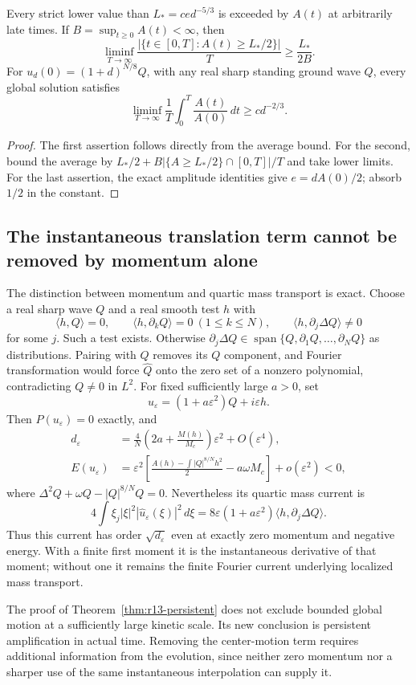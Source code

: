 \begin{corollary}\label{cor:r13-recurring}
Every strict lower value than $L_*=ce d^{-5/3}$ is exceeded by $A(t)$
at arbitrarily late times. If $B=\sup_{t\ge0}A(t)<\infty$, then
\[
 \liminf_{T\to\infty}
 \frac{|\{t\in[0,T]:A(t)\ge L_*/2\}|}{T}
 \ge\frac{L_*}{2B}.
\]
For $u_d(0)=(1+d)^{N/8}Q$, with any real sharp standing ground wave $Q$,
every global solution satisfies
\[
 \liminf_{T\to\infty}\frac1T\int_0^T
        \frac{A(t)}{A(0)}\,dt\ge c d^{-2/3}.
\]
\end{corollary}
\begin{proof}
The first assertion follows directly from the average bound. For the
second, bound the average by
$L_*/2+B|\{A\ge L_*/2\}\cap[0,T]|/T$ and take lower limits.
For the last assertion, the exact amplitude identities give
$e=dA(0)/2$; absorb $1/2$ in the constant.
\end{proof}

\subsection{The instantaneous translation term cannot be removed by momentum alone}
The distinction between momentum and quartic mass transport is exact.
Choose a real sharp wave $Q$ and a real smooth test $h$ with
\[
 \langle h,Q\rangle=0,\qquad
 \langle h,\partial_kQ\rangle=0\ (1\le k\le N),\qquad
 \langle h,\partial_j\Delta Q\rangle\ne0
\]
for some $j$. Such a test exists. Otherwise
$\partial_j\Delta Q\in\operatorname{span}\{Q,\partial_1Q,\ldots,
\partial_NQ\}$ as distributions. Pairing with $Q$ removes its $Q$
component, and Fourier transformation would force $\widehat Q$ onto
the zero set of a nonzero polynomial, contradicting $Q\ne0$ in $L^2$.
For fixed sufficiently large $a>0$, set
\[
 u_\varepsilon=(1+a\varepsilon^2)Q+i\varepsilon h.
\]
Then $P(u_\varepsilon)=0$ exactly, and
\begin{align*}
 d_\varepsilon
 &=\frac4N\left(2a+\frac{M(h)}{M_c}\right)\varepsilon^2
       +O(\varepsilon^4),\\
 E(u_\varepsilon)
 &=\varepsilon^2\left[
 \frac{A(h)-\int|Q|^{8/N}h^2}{2}-a\omega M_c\right]
       +o(\varepsilon^2)<0,
\end{align*}
where $\Delta^2Q+\omega Q-|Q|^{8/N}Q=0$.
Nevertheless its quartic mass current is
\[
 4\int\xi_j|\xi|^2|\widehat u_\varepsilon(\xi)|^2\,d\xi
 =8\varepsilon(1+a\varepsilon^2)
             \langle h,\partial_j\Delta Q\rangle.
\]
Thus this current has order $\sqrt{d_\varepsilon}$ even at exactly zero
momentum and negative energy. With a finite first moment it is the
instantaneous derivative of that moment; without one it remains the
finite Fourier current underlying localized mass transport.

The proof of Theorem~\ref{thm:r13-persistent} does not exclude bounded
global motion at a sufficiently large kinetic scale. Its new conclusion
is persistent amplification in actual time. Removing the center-motion
term requires additional information from the evolution, since neither
zero momentum nor a sharper use of the same instantaneous interpolation
can supply it.

